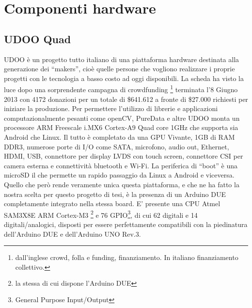 \chapter{Componenti hardware}
\fancyfoot[C]{\thepage } 
\section{UDOO Quad}
UDOO è un progetto tutto italiano di una piattaforma hardware destinata alla 
generazione dei ``makers'', cioè quelle persone che vogliono realizzare i 
proprie progetti con le tecnologia a basso costo ad oggi disponibili. La 
scheda ha visto la luce dopo una sorprendente campagna di crowdfunding
\footnote{dall'inglese crowd, folla e funding, finanziamento. In italiano 
finanziamento collettivo.} terminata l'8 Giugno 2013 con 4172 donazioni per un 
totale di \$641.612 a fronte di \$27.000 richiesti per iniziare la produzione. 
Per permettere l'utilizzo di librerie e applicazioni computazionalmente pesanti 
come openCV, PureData e altre UDOO monta un processore ARM Freescale i.MX6 
Cortex-A9 Quad core 1GHz che supporta sia Android che Linux. Il tutto è 
completato da una GPU Vivante, 1GB di RAM DDR3, numerose porte di I/O come 
SATA, microfono, audio out, Ethernet, HDMI, USB, connettore per display LVDS 
con touch screen, connettore CSI per camera esterna e connettività bluetooth e 
Wi-Fi. La periferica di ``boot'' è una microSD il che permette un rapido 
passaggio da Linux a Android e viceversa. Quello che però rende veramente 
unica questa piattaforma, e che ne ha fatto la nostra scelta per questo 
progetto di tesi, è la presenza di un Arduino DUE completamente integrato 
nella stessa board. 
E' presente una CPU Atmel SAM3X8E ARM Cortex-M3 \footnote{la stessa di cui 
dispone l'Arduino DUE} e 76 GPIO\footnote{General Purpose Input/Output}, di 
cui 62 digitali e 14 digitali/analogici, disposti per essere perfettamente 
compatibili con la piedinatura dell'Arduino DUE e dell'Arduino UNO Rev.3.

